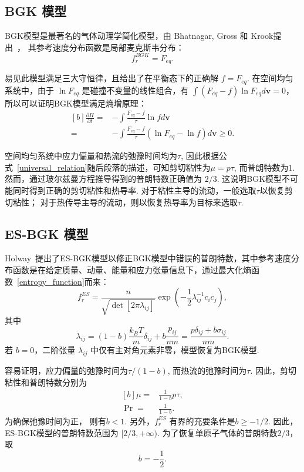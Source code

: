 \subsection{BGK 模型}
BGK模型是最著名的气体动理学简化模型，由 Bhatnagar, Gross 和 Krook提出~\cite{Bhatnagar1954}， 其参考速度分布函数是局部麦克斯韦分布： 
\begin{equation}
f^{BGK}_r=F_{eq}. 
\end{equation}

易见此模型满足三大守恒律，且给出了在平衡态下的正确解 $f=F_{eq}$. 在空间均匀系统中，由于 $\ln{F_{eq}}$ 是碰撞不变量的线性组合，有 $\int(F_{eq}-f)\ln{F_{eq}}d\bm{v}=0$， 所以可以证明BGK模型满足熵增原理：
\begin{equation}\label{H_BGK}
\begin{aligned}[b]
\frac{\partial H}{\partial t}=&	-\int \frac{F_{eq}-f}{\tau}\ln{f} d\bm{v}\\
=&-\int 
\frac{F_{eq}-f}{\tau}(\ln{}F_{eq}-\ln{f}) d\bm{v}\ge0
.
\end{aligned}
\end{equation}


空间均匀系统中应力偏量和热流的弛豫时间均为$\tau$, 因此根据公式~\eqref{universal_relation}随后段落的描述，可知剪切粘性为$\mu=p\tau$, 而普朗特数为1. 然而，通过玻尔兹曼方程推导得到的普朗特数正确值为 $2/3$. 这说明BGK模型不可能同时得到正确的剪切粘性和热导率. 对于粘性主导的流动，一般选取$\tau$以恢复剪切粘性； 对于热传导主导的流动，则以恢复热导率为目标来选取$\tau$. 



\subsection{ES-BGK 模型}

Holway~\cite{holway1966new}提出了ES-BGK模型以修正BGK模型中错误的普朗特数，其中参考速度分布函数是在给定质量、动量、能量和应力张量信息下，通过最大化熵函数~\eqref{entropy_function}而来：
\begin{equation}\label{ellipsoidal_model}
f_r^{ES}=\frac{n}{\sqrt{\operatorname{det}
		[2\pi\lambda_{ij}]}}\exp\left(-\frac{1}{2}\lambda_{ij}^{-1}c_i{c_j}\right), 
\end{equation}
其中
\begin{equation}
\lambda_{ij}=(1-b)\frac{k_BT}{m}\delta_{ij}+b\frac{p_{ij}}{nm}=\frac{p\delta_{ij}+b\sigma_{ij}}{nm}.
\end{equation}
若 $b=0$，二阶张量 $\lambda_{ij}$ 中仅有主对角元素非零，模型恢复为BGK模型. 

容易证明，应力偏量的弛豫时间为$\tau/(1-b)$, 而热流的弛豫时间为$\tau$. 
因此，剪切粘性和普朗特数分别为
\begin{equation}
\begin{aligned}[b]
\mu=&\frac{1}{1-b}{p\tau},\\
{\Pr}=&\frac{1}{1-b}.
\end{aligned}
\end{equation}
为确保弛豫时间为正， 则有$b<1$. 另外，$f_r^{ES}$ 有界的充要条件是$b\ge-1/2$. 因此，ES-BGK模型的普朗特数范围为 $[2/3,+ \infty)$. 为了恢复单原子气体的普朗特数$2/3$，取
\begin{equation}
b=-\frac{1}{2}.
\end{equation} 

